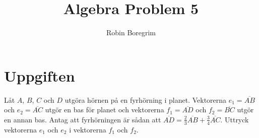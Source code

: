 \documentclass[11pt]{article}
\begin{document}
\title{Algebra Problem 5}
\author{Robin Boregrim}
\maketitle
\renewcommand{\contentsname}{Innehållsförteckning}
\tableofcontents
\newpage
\section{Uppgiften}
Låt $A$, $B$, $C$ och $D$ utgöra hörnen på en fyrhörning i planet. Vektorerna $e_1 = \overline{AB}$ och $e_2 = \overline{AC}$ utgör en bas för planet och vektorerna $f_1 = \overline{AD}$ och $f_2 = \overline{BC}$ utgör en annan bas. Antag att fyrhörningen är sådan att $\overline{AD} = \frac{2}{3}\overline{AB} + \frac{3}{4}\overline{AC}$. Uttryck vektorerna $e_1$ och $e_2$ i vektorerna $f_1$ och $f_2$.
\end{document}
